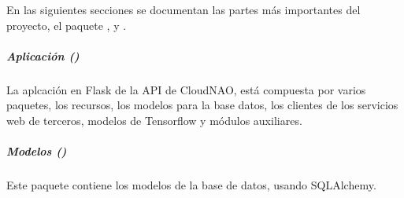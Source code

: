 En las siguientes secciones se documentan las partes más importantes del
proyecto, el paquete ,  y .


\subparagraph{Aplicación ()}
\label{\detokenize{chapter_two/desc_cloudnao:aplicacion-app}}\label{\detokenize{chapter_two/desc_cloudnao:module-app}}
La aplcación en Flask de la API de CloudNAO, está compuesta por varios paquetes,
los recursos, los modelos para la base datos, los clientes de los servicios web de
terceros, modelos de Tensorflow y módulos auxiliares.


\subparagraph{Modelos ()}
\label{\detokenize{chapter_two/desc_cloudnao:module-app.models}}\label{\detokenize{chapter_two/desc_cloudnao:modelos-models}}
Este paquete contiene los modelos de la base de datos, usando SQLAlchemy.
\label{\detokenize{chapter_two/desc_cloudnao:module-app.models.user_model}}\label{\detokenize{chapter_two/desc_cloudnao:module-user_model}}

